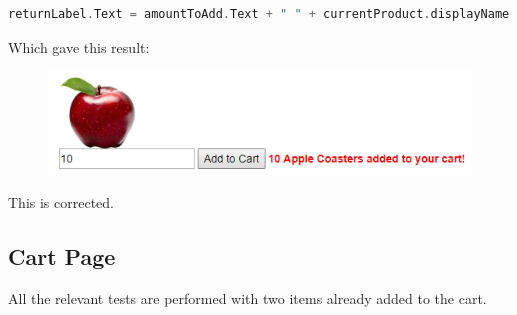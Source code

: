 ﻿\documentclass{article}
\begin{document}
\begin{enumerate}
\begin{lstlisting}[language=C]
returnLabel.Text = amountToAdd.Text + " " + currentProduct.displayName + "s added to your cart!";
        \end{lstlisting}
        Which gave this result:
        \begin{figure}[H]
            \includegraphics{testing/product4.png}
            \centering
        \end{figure}
        This is corrected.
    \end{enumerate}
    \newpage
    \subsection{Cart Page}
    All the relevant tests are performed with two items already added to the cart.
\end{document}
